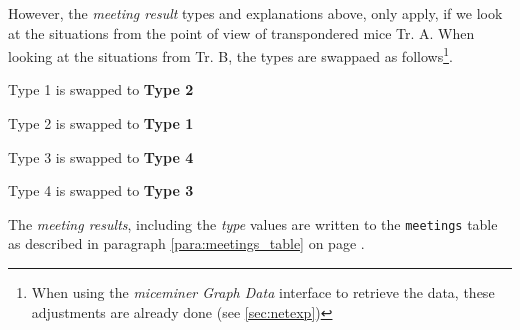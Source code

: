However, the \textit{meeting result} types and explanations above, only apply, if we look at the situations from the point of view of transpondered mice Tr. A. When looking at the situations from Tr. B, the types are swappaed as follows\footnote{When using the \textit{miceminer Graph Data} interface to retrieve the data, these adjustments are already done (see \ref{sec:netexp})}.

\begin{mylist}
\item Type 1 is swapped to \textbf{Type 2}   
\item Type 2 is swapped to \textbf{Type 1}
\item Type 3 is swapped to \textbf{Type 4} 
\item Type 4 is swapped to \textbf{Type 3}
\end{mylist}

The \textit{meeting results}, including the \textit{type} values are written to the \lstinline|meetings| table as described in paragraph \ref{para:meetings_table} on page \pageref{para:meetings_table}.
